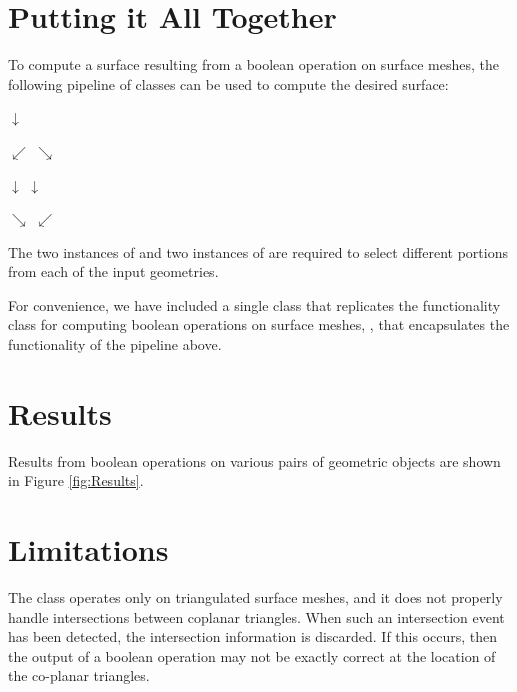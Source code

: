 \documentclass{InsightArticle}
\begin{document}
\section{Putting it All Together}

To compute a surface resulting from a boolean operation on surface meshes, the following pipeline of classes can be used to compute the desired surface: 

\begin{center}

$\downarrow$


$\swarrow$ \hspace{3em} $\searrow$

 

$\downarrow$ \hspace{5em}  $\downarrow$

 

$\searrow$ \hspace{3em} $\swarrow$

\end{center}

The two instances of  and two instances of  are required to select different portions from each of the input geometries.

For convenience, we have included a single class that replicates the functionality  class for computing boolean operations on surface meshes, , that encapsulates the functionality of the pipeline above.

\section{Results}

Results from boolean operations on various pairs of geometric objects are shown in Figure \ref{fig:Results}.

%

\section{Limitations}

The  class operates only on triangulated surface meshes, and it does not properly handle intersections between coplanar triangles. When such an intersection event has been detected, the intersection information is discarded. If this occurs, then the output of a boolean operation may not be exactly correct at the location of the co-planar triangles.
\end{document}
